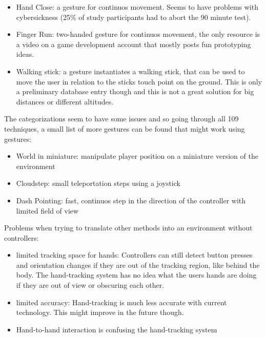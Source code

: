 \begin{itemize}
\item
  Hand Close: a gesture for continuos movement. Seems to have problems
  with cybersickness (25\% of study participants had to
  abort the 90 minute test). \cite{Huang}
\item
  Finger Run: two-handed gesture for continuos movement, the only
  resource is a video on a game development account that mostly posts fun
  prototyping ideas. \cite{Beauchamp}
\item
  Walking stick: a gesture instantiates a walking stick, that can be
  used to move the user in relation to the sticks touch point on the
  ground. This is only a preliminary database entry though and this is
  not a great solution for big distances or different altitudes. %
\end{itemize}

The categorizations seem to have some issues and so going through all
109 techniques, a small list of more gestures can be found that might work using gestures:

\begin{itemize}
\itemsep1pt\parskip0pt
\item
  World in miniature: manipulate player position on a miniature version of the environment
\item
  Cloudstep: small teleportation steps using a joystick
\item
  Dash Pointing: fast, continuos step in the direction of the controller with limited field of view
\end{itemize}


Problems when trying to translate other methods into an environment without controllers:

\begin{itemize}
\item
  limited tracking space for hands: Controllers can still detect button
  presses and orientation changes if they are out of the tracking
  region, like behind the body. The hand-tracking system has no idea
  what the users hands are doing if they are out of view or obscuring
  each other.\\
\item
  limited accuracy: Hand-tracking is much less accurate with current
  technology. This might improve in the future though.\\
\item
  Hand-to-hand interaction is confusing the hand-tracking system\\
\end{itemize}


